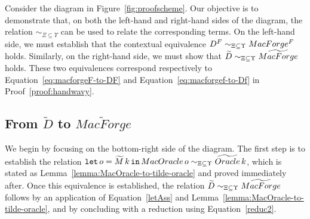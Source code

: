 Consider the diagram in Figure~\ref{fig:proofscheme}. Our objective is to demonstrate that, on both the left-hand and right-hand sides of the diagram, the relation $\sim_{\Xi \subseteq \Upsilon}$ can be used to relate the corresponding terms. On the left-hand side, we must establish that the contextual equivalence  $D^F \sim_{\Xi\subseteq\Upsilon} MacForge^F$ holds. Similarly, on the right-hand side, we must show that $\widetilde{D} \sim_{\Xi\subseteq\Upsilon} \widetilde{MacForge}$ holds. These two equivalences correspond respectively to Equation~\ref{eq:macforgeF-to-DF} and Equation~\ref{eq:macforgef-to-Df} in Proof~\ref{proof:handwavy}.

\subsection{From \texorpdfstring{$\widetilde{D}$}{MacOracle} to \texorpdfstring{$\widetilde{MacForge}$}{MacForge}}
We begin by focusing on the bottom-right side of the diagram. The first step is to establish the relation $\mathtt{let}\,o=\widetilde{M}\,k\,\mathtt{in}\, MacOracle\,o \sim_{\Xi\subseteq\Upsilon} \widetilde{Oracle}\,k$, which is stated as Lemma~\ref{lemma:MacOracle-to-tilde-oracle} and proved immediately after. Once this equivalence is established, the relation $\widetilde{D} \sim_{\Xi\subseteq\Upsilon} \widetilde{MacForge}$ follows by an application of Equation~\ref{letAss} and Lemma~\ref{lemma:MacOracle-to-tilde-oracle}, and by concluding with a reduction using Equation~\ref{reduc2}.

